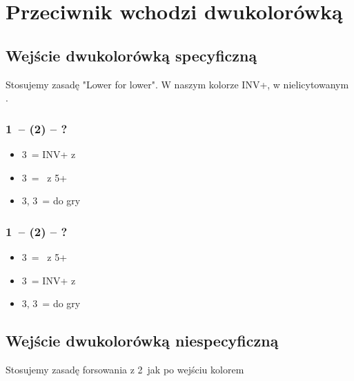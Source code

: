 \documentclass[12pt, a4paper]{article}
\begin{document}
 

\pagebreak
\section{Przeciwnik wchodzi dwukolorówką}
\subsection*{Wejście dwukolorówką specyficzną}
Stosujemy zasadę "Lower for lower". W naszym kolorze INV+, w nielicytowanym \gf.
\\[.6em]

\begin{minipage}{0.5\linewidth}
    \subsubsection*{1\hearts\ -- (2\ntx) -- ?}
    \begin{itemize}  
        \item 3\clubs\ = INV+ z \hearts
        \item 3\diams\ = \gf\ z 5+\spades
        \item 3\hearts, 3\spades\ = do gry
    \end{itemize} 
\end{minipage}
\begin{minipage}{0.3\linewidth}
    \subsubsection*{1\spades\ -- (2\ntx) -- ?}
        \begin{itemize} 
            \item 3\clubs\ = \gf\ z 5+\hearts
            \item 3\diams\ = INV+ z \spades
            \item 3\hearts, 3\spades\ = do gry
        \end{itemize}
\end{minipage}

\subsection*{Wejście dwukolorówką niespecyficzną}
Stosujemy zasadę forsowania z 2\nt\ jak po wejściu kolorem
\\[.6em]
\end{document}
